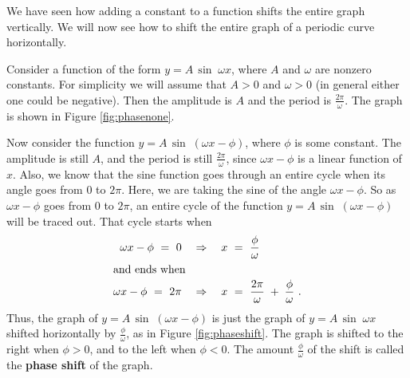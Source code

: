 We have seen how adding a constant to a function shifts the entire graph vertically. We will now see
how to shift the entire graph of a periodic curve horizontally.

Consider a function of the form $y=A\,\sin\;\omega x$, where $A$ and $\omega$ are nonzero constants.
For simplicity we will assume that $A >0$ and $\omega > 0$ (in general either one could be
negative). Then the amplitude is $A$ and the period is $\frac{2\pi}{\omega}$. The graph is shown in
Figure \ref{fig:phasenone}.

Now consider the function $y=A\,\sin\;(\omega x - \phi)$, where $\phi$ is some constant. The
amplitude is still $A$, and the period is still $\frac{2\pi}{\omega}$, since $\omega x - \phi$ is a
linear function of $x$. Also, we know that the sine function goes through an entire cycle when its
angle goes from $0$ to $2\pi$. Here, we are taking the sine of the angle $\omega x - \phi$. So as
$\omega x - \phi$ goes from $0$ to $2\pi$, an entire cycle of the function
$y=A\,\sin\;(\omega x - \phi)$ will be traced out. That cycle starts when
\begin{align*}
 \omega x - \phi ~=~ 0 \quad&\Rightarrow\quad x ~=~ \frac{\phi}{\omega}\\
\intertext{and ends when}
 \omega x - \phi ~=~ 2\pi \quad&\Rightarrow\quad x ~=~ \frac{2\pi}{\omega}\;+\;\frac{\phi}{\omega}~.
\end{align*}
Thus, the graph of $y=A\,\sin\;(\omega x - \phi)$ is just the graph of $y=A\,\sin\;\omega x$
shifted horizontally by $\frac{\phi}{\omega}$, as in Figure \ref{fig:phaseshift}. The graph is
shifted to the right when $\phi >0$, and to the left when $\phi <0$. The amount
$\frac{\phi}{\omega}$ of the shift is called the \textbf{phase shift} of the
graph.

